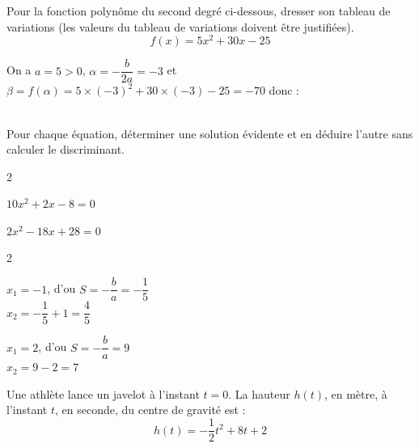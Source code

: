 \documentclass[12pt,a4paper]{article}  %
\begin{document}
\vspace{-0.3cm}
Pour la fonction polynôme du second degré ci-dessous, dresser son tableau de variations (les valeurs du tableau de variations doivent être justifiées).
$$f(x)=5x^2+30x-25$$
\begin{corrBox}
	On a $a=5>0$, $\alpha=-\dfrac{b}{2a}=-3$ et $\beta=f(\alpha)=5\times (-3)^2+30\times (-3)-25=-70$ donc :\\
	\ \\
\end{corrBox}

\vspace{-0.3cm}

Pour chaque équation, déterminer une solution évidente et en déduire l'autre sans calculer le discriminant.
\begin{multicols}{2}
\begin{enumMet}
    \item $10x^2+2x-8=0$ \quad {}
    \item $2x^2-18x+28=0$ \quad {}
\end{enumMet}
\end{multicols}

\begin{corrBox}
	\begin{multicols}{2}
		\begin{enumMet}
			\item $x_1=-1$, d'ou $S=-\dfrac{b}{a}=-\dfrac{1}{5}$\\
			$x_2=-\dfrac{1}{5}+1=\dfrac{4}{5}$
			\item $x_1=2$, d'ou $S=-\dfrac{b}{a}=9$\\
			$x_2=9-2=7$
		\end{enumMet}
	\end{multicols}
\end{corrBox}



Une athlète lance un javelot à l'instant $t=0$. La hauteur $h(t)$, en mètre, à l'instant $t$, en seconde, du centre de gravité est :
$$
h(t)=-\frac{1}{2} t^2+8 t+2
$$
\end{document}
